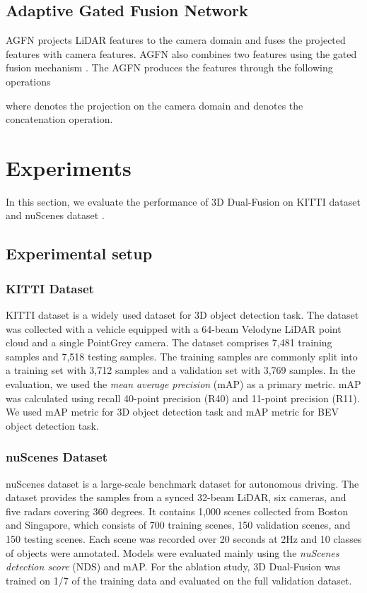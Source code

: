 \documentclass[lettersize,journal]{IEEEtran}
\begin{document}
\subsection{Adaptive Gated Fusion Network}
 AGFN projects LiDAR features to the camera domain and fuses the projected features with camera features. AGFN also combines two features using the gated fusion mechanism \cite{gatedfusion}.  The AGFN produces the features  through the following operations

where  denotes the projection on the camera domain and  denotes the concatenation operation.  




\section{Experiments} 
\label{Experiments}
In this section, we evaluate the performance of 3D Dual-Fusion on  KITTI dataset \cite{kitti} and  nuScenes dataset \cite{nuscenes}. 
\subsection{Experimental setup}

\subsubsection{KITTI Dataset}
KITTI dataset is a widely used dataset for 3D object detection task. The dataset was collected with a vehicle equipped with a 64-beam Velodyne LiDAR point cloud and a single PointGrey camera. The dataset comprises 7,481 training samples and 7,518 testing samples. The training samples are commonly split into a training set with 3,712 samples and a validation set with 3,769 samples. In the evaluation, we used the {\it mean average precision} (mAP) as a primary metric. mAP was calculated using recall 40-point precision (R40) and 11-point precision (R11).   We used mAP metric  for 3D object detection task and mAP metric  for BEV object detection task. 

\subsubsection{nuScenes Dataset}
nuScenes dataset is a large-scale benchmark dataset for autonomous driving. The dataset provides the samples from a synced 32-beam LiDAR, six cameras, and five radars covering 360 degrees. It contains 1,000 scenes collected from Boston and Singapore, which consists of 700 training scenes, 150 validation scenes, and 150 testing scenes.  Each scene was recorded over 20 seconds at 2Hz and  10 classes of objects were annotated.  Models were evaluated mainly using the {\it nuScenes detection score} (NDS) \cite{nuscenes} and mAP. For the ablation study, 3D Dual-Fusion was trained on  1/7 of the training data and evaluated on the full validation dataset.
\end{document}
